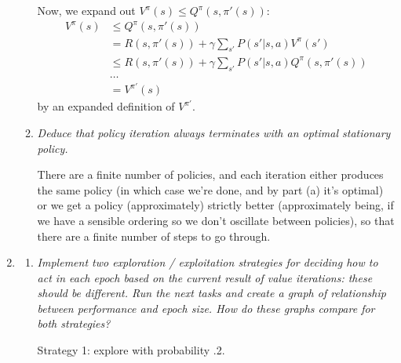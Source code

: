 \documentclass{article}
\begin{document}
\begin{enumerate}
\begin{enumerate}
    Now, we expand out $V^\pi(s)\leq Q^\pi(s,\pi'(s))$:
    \begin{align*}
      V^\pi(s) & \leq Q^\pi(s,\pi'(s)) \\
      & = R(s,\pi'(s))+\gamma \sum_{s'} P(s'|s,a)V^\pi(s') \\
      & \leq R(s,\pi'(s))+\gamma \sum_{s'} P(s'|s,a) Q^\pi(s,\pi'(s))\\
      & \ldots \\
      & = V^{\pi'}(s)
    \end{align*}
    by an expanded definition of $V^{\pi'}$. 


  \item \emph{Deduce that policy iteration always terminates with an
    optimal stationary policy.}
    
    There are a finite number of policies, and each iteration either
    produces the same policy (in which case we're done, and by part
    (a) it's optimal) or we get a policy (approximately) strictly
    better (approximately being, if we have a sensible ordering so we
    don't oscillate between policies), so that there are a finite
    number of steps to go through.
  \end{enumerate}

\item 
  \begin{enumerate}
  \item \emph{Implement two exploration / exploitation strategies for
    deciding how to act in each epoch based on the current result of
    value iterations: these should be different.  Run the next tasks
    and create a graph of relationship between performance and epoch
    size. How do these graphs compare for both strategies?}

    Strategy 1: explore with probability .2.


\end{enumerate}
\end{enumerate}
\end{document}
